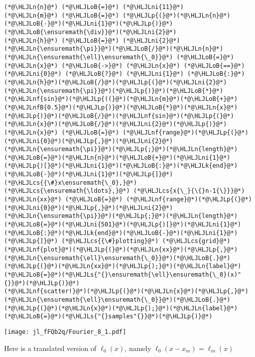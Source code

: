 \documentclass[12pt,a4paper]{article}
\newcommand{\HLJLk}[1]{\textcolor[RGB]{148,91,176}{\textbf{#1}}}
\newcommand{\HLJLn}[1]{#1}
\newcommand{\HLJLnf}[1]{\textcolor[RGB]{66,102,213}{#1}}
\newcommand{\HLJLs}[1]{\textcolor[RGB]{201,61,57}{#1}}
\newcommand{\HLJLnfB}[1]{\textcolor[RGB]{59,151,46}{#1}}
\newcommand{\HLJLni}[1]{\textcolor[RGB]{59,151,46}{#1}}
\newcommand{\HLJLoB}[1]{\textcolor[RGB]{102,102,102}{\textbf{#1}}}
\newcommand{\HLJLp}[1]{#1}
\newcommand{\HLJLcs}[1]{\textcolor[RGB]{153,153,119}{\textit{#1}}}
\begin{document}
\begin{lstlisting}
(*@\HLJLn{n}@*) (*@\HLJLoB{=}@*) (*@\HLJLni{11}@*)
(*@\HLJLn{m}@*) (*@\HLJLoB{=}@*) (*@\HLJLp{(}@*)(*@\HLJLn{n}@*)(*@\HLJLoB{-}@*)(*@\HLJLni{1}@*)(*@\HLJLp{)}@*)(*@\HLJLoB{\ensuremath{\div}}@*)(*@\HLJLni{2}@*)
(*@\HLJLn{h}@*) (*@\HLJLoB{=}@*) (*@\HLJLni{2}@*)(*@\HLJLn{\ensuremath{\pi}}@*)(*@\HLJLoB{/}@*)(*@\HLJLn{n}@*)
(*@\HLJLn{\ensuremath{\ell}\ensuremath{\_0}}@*) (*@\HLJLoB{=}@*) (*@\HLJLn{x}@*) (*@\HLJLoB{->}@*) (*@\HLJLn{x}@*) (*@\HLJLoB{==}@*) (*@\HLJLni{0}@*) (*@\HLJLoB{?}@*) (*@\HLJLni{1}@*) (*@\HLJLoB{:}@*) (*@\HLJLn{h}@*)(*@\HLJLoB{/}@*)(*@\HLJLp{(}@*)(*@\HLJLni{2}@*)(*@\HLJLn{\ensuremath{\pi}}@*)(*@\HLJLp{)}@*)(*@\HLJLoB{*}@*)(*@\HLJLnf{sin}@*)(*@\HLJLp{((}@*)(*@\HLJLn{m}@*)(*@\HLJLoB{+}@*)(*@\HLJLnfB{0.5}@*)(*@\HLJLp{)}@*)(*@\HLJLoB{*}@*)(*@\HLJLn{x}@*)(*@\HLJLp{)}@*)(*@\HLJLoB{/}@*)(*@\HLJLnf{sin}@*)(*@\HLJLp{(}@*)(*@\HLJLn{x}@*)(*@\HLJLoB{/}@*)(*@\HLJLni{2}@*)(*@\HLJLp{)}@*)
(*@\HLJLn{x}@*) (*@\HLJLoB{=}@*) (*@\HLJLnf{range}@*)(*@\HLJLp{(}@*)(*@\HLJLni{0}@*)(*@\HLJLp{,}@*)(*@\HLJLni{2}@*)(*@\HLJLn{\ensuremath{\pi}}@*)(*@\HLJLp{;}@*)(*@\HLJLn{length}@*)(*@\HLJLoB{=}@*)(*@\HLJLn{n}@*)(*@\HLJLoB{+}@*)(*@\HLJLni{1}@*)(*@\HLJLp{)[}@*)(*@\HLJLni{1}@*)(*@\HLJLoB{:}@*)(*@\HLJLk{end}@*)(*@\HLJLoB{-}@*)(*@\HLJLni{1}@*)(*@\HLJLp{]}@*) (*@\HLJLcs{{\#}x\ensuremath{\_0},}@*) (*@\HLJLcs{\ensuremath{\ldots},}@*) (*@\HLJLcs{x{\_}{\{}n-1{\}}}@*)
(*@\HLJLn{xx}@*) (*@\HLJLoB{=}@*) (*@\HLJLnf{range}@*)(*@\HLJLp{(}@*)(*@\HLJLni{0}@*)(*@\HLJLp{,}@*)(*@\HLJLni{2}@*)(*@\HLJLn{\ensuremath{\pi}}@*)(*@\HLJLp{;}@*)(*@\HLJLn{length}@*)(*@\HLJLoB{=}@*)(*@\HLJLni{501}@*)(*@\HLJLp{)[}@*)(*@\HLJLni{1}@*)(*@\HLJLoB{:}@*)(*@\HLJLk{end}@*)(*@\HLJLoB{-}@*)(*@\HLJLni{1}@*)(*@\HLJLp{]}@*) (*@\HLJLcs{{\#}plotting}@*) (*@\HLJLcs{grid}@*)
(*@\HLJLnf{plot}@*)(*@\HLJLp{(}@*)(*@\HLJLn{xx}@*)(*@\HLJLp{,}@*)(*@\HLJLn{\ensuremath{\ell}\ensuremath{\_0}}@*)(*@\HLJLoB{.}@*)(*@\HLJLp{(}@*)(*@\HLJLn{xx}@*)(*@\HLJLp{);}@*)(*@\HLJLn{label}@*)(*@\HLJLoB{=}@*)(*@\HLJLs{"{}\ensuremath{\ell}\ensuremath{\_0}(x)"{}}@*)(*@\HLJLp{)}@*)
(*@\HLJLnf{scatter!}@*)(*@\HLJLp{(}@*)(*@\HLJLn{x}@*)(*@\HLJLp{,}@*)(*@\HLJLn{\ensuremath{\ell}\ensuremath{\_0}}@*)(*@\HLJLoB{.}@*)(*@\HLJLp{(}@*)(*@\HLJLn{x}@*)(*@\HLJLp{);}@*)(*@\HLJLn{label}@*)(*@\HLJLoB{=}@*)(*@\HLJLs{"{}samples"{}}@*)(*@\HLJLp{)}@*)
\end{lstlisting}

\texttt{[image: jl\_fFQb2q/Fourier\_8\_1.pdf]}

Here is a translated version of $\ell_0(x)$, namely $\ell_0(x-x_{m}) = \ell_{m}(x)$
\end{document}
